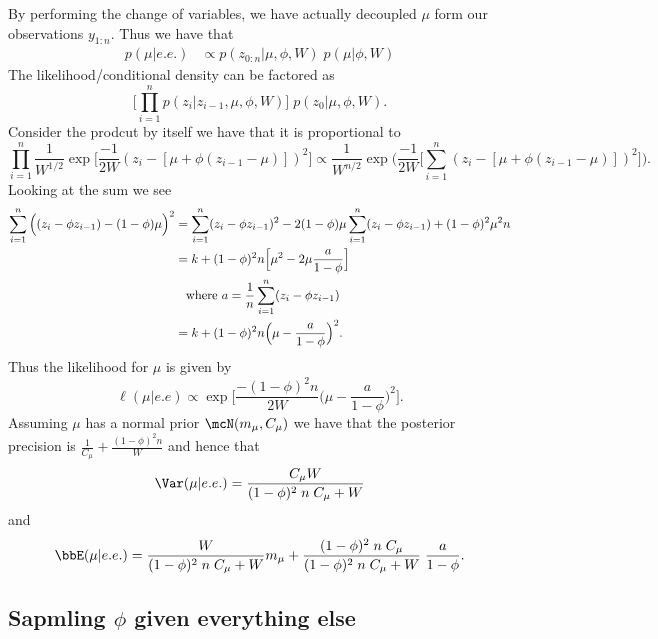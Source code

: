 \documentclass{article}
\begin{document}
By performing the change of variables, we have actually decoupled $\mu$ form our observations $y_{1:n}$.  Thus we have that
\begin{align*}
p(\mu | e.e.) 
& \propto p(z_{0:n} | \mu, \phi, W) \; p(\mu | \phi, W)
\end{align*}
The likelihood/conditional density can be factored as
\[
\Big[ \prod_{i=1}^n p(z_i | z_{i-1}, \mu, \phi, W) \Big] \; p(z_0 | \mu, \phi, W).
\]
Consider the prodcut by itself we have that it is proportional to
\[
\prod_{i=1}^n \frac{1}{W^{1/2}} \exp \Big[ \frac{-1}{2W} (z_i - [\mu + \phi(z_{i-1} - \mu)])^2 \Big] 
\propto
\frac{1}{W^{n/2}} \exp \Big( \frac{-1}{2W} \Big[ \sum_{i=1}^n (z_i - [\mu + \phi(z_{i-1} - \mu)])^2 \Big] \Big).
\]
Looking at the sum we see
\begin{align*}
\sum_{i=1}^n \Big( (z_i - \phi z_{i-1}) - (1-\phi) \mu \Big)^2
& = \sum_{i=1}^n (z_i- \phi z_{i-1})^2 - 2 (1-\phi) \mu \sum_{i=1}^n (z_i - \phi z_{i-1}) + (1-\phi)^2 \mu^2 n \\
& = k + (1-\phi)^2 n \Big[ \mu^2 - 2 \mu \frac{a}{1-\phi} \Big] \\
& \; \; \textmd{ where } a = \frac{1}{n} \sum_{i=1}^n (z_i - \phi z_{i-1}) \\
& = k + (1-\phi)^2 n \Big( \mu - \frac{a}{1-\phi} \Big)^2. 
\end{align*}
Thus the likelihood for $\mu$ is given by
\[
\ell (\mu | e.e) \propto \exp \Big[ \frac{-(1-\phi)^2 n}{2W} \Big(\mu - \frac{a}{1-\phi} \Big)^2 \Big].
\]
Assuming $\mu$ has a normal prior $\mcN(m_\mu, C_\mu)$ we have that the posterior precision is $\frac{1}{C_\mu} + \frac{(1-\phi)^2 n}{W}$ and hence that
\[
\Var(\mu | e.e.) = \frac{C_\mu W}{(1-\phi)^2 \; n \; C_\mu + W}
\]
and
\[
\bbE(\mu | e.e.) = \frac{W}{(1-\phi)^2 \; n \; C_\mu + W} m_\mu + \frac{(1 - \phi)^2 \; n \; C_\mu}{(1-\phi)^2 \; n \; C_\mu + W} \; \frac{a}{1-\phi}.
\]

\subsection{Sapmling $\phi$ given everything else}
\end{document}
